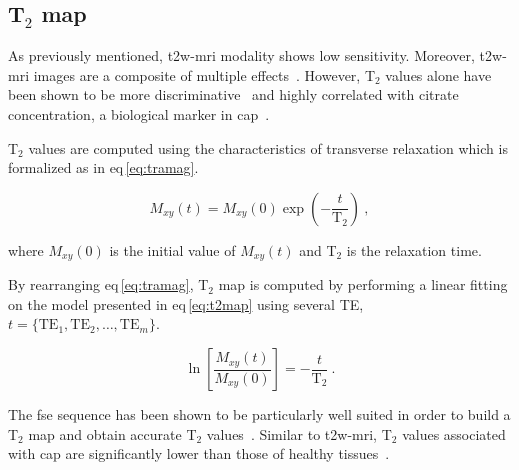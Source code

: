 \subsection{T$_2$ map} \label{subsec:chp2:imaging:t2}
As previously mentioned, \ac{t2w}-\ac{mri} modality shows low sensitivity.
Moreover, \ac{t2w}-\ac{mri} images are a composite of multiple
effects~\cite{Hegde2013}.
However, T$_2$ values alone have been shown to be more
discriminative~\cite{Liu2011} and highly correlated with citrate concentration,
a biological marker in \ac{cap}~\cite{Liney1996,Liney1997}.

T$_2$ values are computed using the characteristics of transverse relaxation
which is formalized as in \acs{eq}\,\eqref{eq:tramag}.

\begin{equation}
  M_{xy}(t) = M_{xy}(0) \exp \left( - \frac{t}{\text{T}_2} \right) \ ,
  \label{eq:tramag}
\end{equation}

\noindent where $M_{xy}(0)$ is the initial value of $M_{xy}(t)$ and T$_2$ is
the relaxation time.

By rearranging \acs{eq}\,\eqref{eq:tramag}, T$_2$ map is computed by performing
a linear fitting on the model presented in \acs{eq}\,\eqref{eq:t2map} using
several TE, $t=\{ \text{TE}_1,\text{TE}_2, \dotsc ,\text{TE}_m \}$.

\begin{equation}
  \ln \left[ \frac{M_{xy}(t)}{M_{xy}(0)} \right] = - \frac{t}{\text{T}_2} \ .
  \label{eq:t2map}
\end{equation}

The \Ac{fse} sequence has been shown to be particularly well suited in order to
build a T$_2$ map and obtain accurate T$_2$ values~\cite{Liney1996a}.
Similar to \ac{t2w}-\ac{mri}, T$_2$ values associated with \ac{cap} are
significantly lower than those of healthy tissues~\cite{Liney1996,Gibbs2001}.


